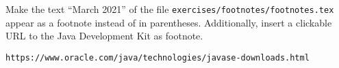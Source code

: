 Make the text \enquote{March 2021} of the file \texttt{exercises/footnotes/footnotes.tex} appear as a footnote instead of in parentheses. Additionally, insert a clickable URL to the Java Development Kit as footnote.


\texttt{https://www.oracle.com/java/technologies/javase-downloads.html}

